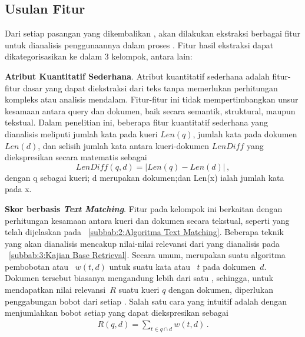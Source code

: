 \subsection{Usulan Fitur}
\label{subbab:3:Usulan Fitur}
Dari setiap pasangan yang dikembalikan \base{} \retriever{}, akan dilakukan ekstraksi berbagai fitur untuk dianalisis penggunaannya dalam proses \reranking{}. Fitur hasil ekstraksi dapat dikategorisasikan ke dalam 3 kelompok, antara lain:

\vspace{2mm}
\noindent{}\textbf{Atribut Kuantitatif Sederhana}. Atribut kuantitatif sederhana adalah fitur-fitur dasar yang dapat diekstraksi dari teks tanpa memerlukan perhitungan kompleks atau analisis mendalam. Fitur-fitur ini tidak mempertimbangkan unsur kesamaan antara query dan dokumen, baik secara semantik, struktural, maupun tekstual. Dalam penelitian ini, beberapa fitur kuantitatif sederhana yang dianalisis meliputi jumlah kata pada kueri \(Len(q)\), jumlah kata pada dokumen \(Len(d)\), dan selisih jumlah kata antara kueri-dokumen \(LenDiff\) yang diekspresikan secara matematis sebagai
\[LenDiff(q,d)=|Len(q)-Len(d)| \, ,\]
dengan q sebagai kueri; d merupakan dokumen;dan Len(x) ialah jumlah kata pada x.

\vspace{2mm}
\noindent{}\textbf{Skor berbasis \textit{Text Matching}}. Fitur pada kelompok ini berkaitan dengan perhitungan kesamaan antara kueri dan dokumen secara tekstual, seperti yang telah dijelaskan pada \subbab{}~\ref{subbab:2:Algoritma Text Matching}. Beberapa teknik yang akan dianalisis mencakup nilai-nilai relevansi dari \base{} \retriever{} yang dianalisis pada \subbab{}~\ref{subbab:3:Kajian Base Retrieval}. Secara umum, \base{} \retriever{} merupakan suatu algoritma pembobotan atau \weighting{}~\(w(t,d)\) untuk suatu kata atau \term{}~\(t\) pada dokumen~\(d\). Dokumen tersebut biasanya mengandung lebih dari satu \term{}, sehingga, untuk mendapatkan nilai relevansi~\(R\) suatu kueri \(q\) dengan dokumen, diperlukan penggabungan bobot dari setiap \term{}. Salah satu cara yang intuitif adalah dengan menjumlahkan bobot setiap \term{} yang dapat diekspresikan sebagai
\begin{align*}
    R(q,d)=\sum_{t\in{}q\cap{}d}w(t,d) \, .
\end{align*}
    
